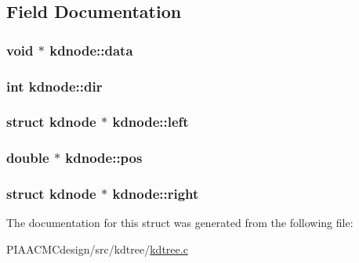 \subsection{Field Documentation}
\hypertarget{structkdnode_a6a63d35d219efceb75941dcd0d9c7f6d}{
\subsubsection[{data}]{\setlength{\rightskip}{0pt plus 5cm}void $\ast$ kdnode\+::data}}\label{structkdnode_a6a63d35d219efceb75941dcd0d9c7f6d}
\hypertarget{structkdnode_aa3b02f2e7995f08cd16a85ea93e1fc80}{
\subsubsection[{dir}]{\setlength{\rightskip}{0pt plus 5cm}int kdnode\+::dir}}\label{structkdnode_aa3b02f2e7995f08cd16a85ea93e1fc80}
\hypertarget{structkdnode_ace3a2b66b16cf107e27885c9488c5f9d}{
\subsubsection[{left}]{\setlength{\rightskip}{0pt plus 5cm}struct {\bf kdnode} $\ast$ kdnode\+::left}}\label{structkdnode_ace3a2b66b16cf107e27885c9488c5f9d}
\hypertarget{structkdnode_a52c94a594d1665e9dfea5cfec629e194}{
\subsubsection[{pos}]{\setlength{\rightskip}{0pt plus 5cm}double $\ast$ kdnode\+::pos}}\label{structkdnode_a52c94a594d1665e9dfea5cfec629e194}
\hypertarget{structkdnode_a560fdae1b98325057e95c817f76bee67}{
\subsubsection[{right}]{\setlength{\rightskip}{0pt plus 5cm}struct {\bf kdnode} $\ast$ kdnode\+::right}}\label{structkdnode_a560fdae1b98325057e95c817f76bee67}


The documentation for this struct was generated from the following file\+:\begin{DoxyCompactItemize}
\item 
P\+I\+A\+A\+C\+M\+Cdesign/src/kdtree/\hyperlink{PIAACMCdesign_2src_2kdtree_2kdtree_8c}{kdtree.\+c}\end{DoxyCompactItemize}
